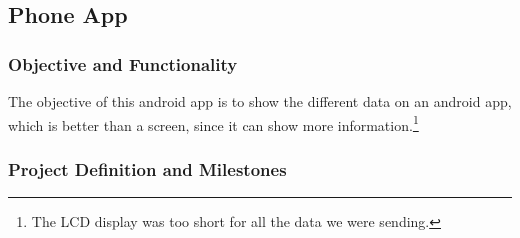 \subsection{Phone App}

\subsubsection{Objective and Functionality}
The objective of this android app is to show the different data on an android app, which is better than a screen, since it can show more information.\footnote{The LCD display was too short for all the data we were sending.}

\subsubsection{Project Definition and Milestones}
